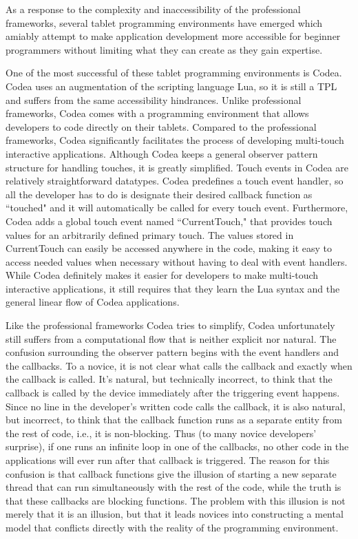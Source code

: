 As a response to the complexity and inaccessibility of the professional frameworks, several tablet programming environments have emerged which amiably attempt to make application development more accessible for beginner programmers without limiting what they can create as they gain expertise. 

One of the most successful of these tablet programming environments is Codea\cite{Codea}. Codea uses an augmentation of the scripting language Lua, so it is still a TPL and suffers from the same accessibility hindrances. Unlike professional frameworks, Codea comes with a programming environment that allows developers to code directly on their tablets. Compared to the professional frameworks, Codea significantly facilitates the process of developing multi-touch interactive applications. Although Codea keeps a general observer pattern structure for handling touches, it is greatly simplified. Touch events in Codea are relatively straightforward datatypes. Codea predefines a touch event handler, so all the developer has to do is designate their desired callback function as ``touched" and it will automatically be called for every touch event. Furthermore, Codea adds a global touch event named ``CurrentTouch," that provides touch values for an arbitrarily defined primary touch. The values stored in CurrentTouch can easily be accessed anywhere in the code, making it easy to access needed values when necessary without having to deal with event handlers. While Codea definitely makes it easier for developers to make multi-touch interactive applications, it still requires that they learn the Lua syntax and the general linear flow of Codea applications. 

Like the professional frameworks Codea tries to simplify, Codea unfortunately still suffers from a computational flow that is neither explicit nor natural. The confusion surrounding the observer pattern begins with the event handlers and the callbacks. To a novice, it is not clear what calls the callback and exactly when the callback is called. It's natural, but technically incorrect, to think that the callback is called by the device immediately after the triggering event happens. Since no line in the developer's written code calls the callback, it is also natural, but incorrect, to think that the callback function runs as a separate entity from the rest of code, i.e., it is non-blocking. Thus (to many novice developers' surprise), if one runs an infinite loop in one of the callbacks, no other code in the applications will ever run after that callback is triggered. The reason for this confusion is that callback functions give the illusion of starting a new separate thread that can run simultaneously with the rest of the code, while the truth is that these callbacks are blocking functions. The problem with this illusion is not merely that it is an illusion, but that it leads novices into constructing a mental model that conflicts directly with the reality of the programming environment. 

